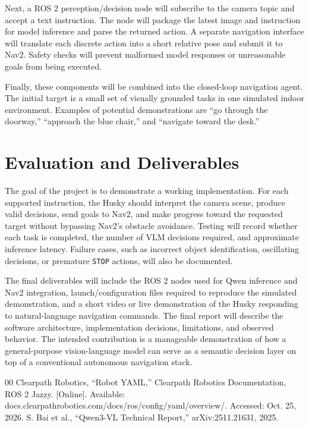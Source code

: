 \documentclass[conference]{IEEEtran}
\begin{document}
Next, a ROS 2 perception/decision node will subscribe to the camera topic and accept a text instruction. The node will package the latest image and instruction for model inference and parse the returned action. A separate navigation interface will translate each discrete action into a short relative pose and submit it to Nav2. Safety checks will prevent malformed model responses or unreasonable goals from being executed.

Finally, these components will be combined into the closed-loop navigation agent. The initial target is a small set of visually grounded tasks in one simulated indoor environment. Examples of potential demonstrations are ``go through the doorway,'' ``approach the blue chair,'' and ``navigate toward the desk.''

\section{Evaluation and Deliverables}
The goal of the project is to demonstrate a working implementation. For each supported instruction, the Husky should interpret the camera scene, produce valid decisions, send goals to Nav2, and make progress toward the requested target without bypassing Nav2's obstacle avoidance. Testing will record whether each task is completed, the number of VLM decisions required, and approximate inference latency. Failure cases, such as incorrect object identification, oscillating decisions, or premature \texttt{STOP} actions, will also be documented.

The final deliverables will include the ROS 2 nodes used for Qwen inference and Nav2 integration, launch/configuration files required to reproduce the simulated demonstration, and a short video or live demonstration of the Husky responding to natural-language navigation commands. The final report will describe the software architecture, implementation decisions, limitations, and observed behavior. The intended contribution is a manageable demonstration of how a general-purpose vision-language model can serve as a semantic decision layer on top of a conventional autonomous navigation stack.

\begin{thebibliography}{00}
 Clearpath Robotics, ``Robot YAML,'' Clearpath Robotics Documentation, ROS 2 Jazzy. [Online]. Available: docs.clearpathrobotics.com/docs/ros/config/yaml/overview/. Accessed: Oct. 25, 2026.
 S. Bai et al., ``Qwen3-VL Technical Report,'' arXiv:2511.21631, 2025.
\end{thebibliography}
\end{document}
